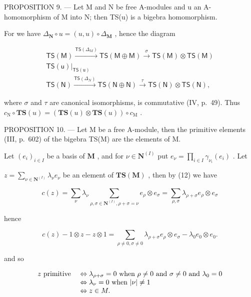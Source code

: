 PROPOSITION 9. --- Let M and N be free A-modules and u an A-homomorphism of M into N; then TS(u) is a bigebra homomorphism.

For we have \(\Delta_{\mathbf{N}} \circ u = (u, u) \circ \Delta_{\mathbf{M}}\) , hence the diagram

\[
\begin{array}{c} \mathsf {T S (M)} \xrightarrow {\mathsf {T S} (\Delta_ {M})} \mathsf {T S (M \oplus M)} \xrightarrow {\sigma} \mathsf {T S (M)} \otimes \mathsf {T S (M)} \\ \mathsf {T S (u)} \Bigg | _ {\mathsf {T S (u)}} \\ \mathsf {T S (N)} \xrightarrow {\mathsf {T S} (\Delta_ {N})} \mathsf {T S (N \oplus N)} \xrightarrow {\tau} \mathsf {T S (N)} \otimes \mathsf {T S (N)}, \end{array}
\]

where \(\sigma\) and \(\tau\) are canonical isomorphisms, is commutative (IV, p.~49). Thus \(c_{\mathrm{N}} \circ \mathbf{T}\mathbf{S}(u) = (\mathbf{T}\mathbf{S}(u) \otimes \mathbf{T}\mathbf{S}(u)) \circ c_{\mathrm{M}}\) .

PROPOSITION 10. --- Let M be a free A-module, then the primitive elements (III, p.~602) of the bigebra TS(M) are the elements of M.

Let \((e_i)_{i\in I}\) be a basis of \(\mathbf{M}\) , and for \(\nu \in \mathbf{N}^{(I)}\) put \(e_{\nu} = \prod_{i\in I}\gamma_{\nu_i}(e_i)\) . Let

\(z = \sum_{\nu \in \mathbf{N}^{(I)}} \lambda_{\nu} e_{\nu}\) be an element of \(\mathbf{T}\mathbf{S}(\mathbf{M})\) , then by (12) we have

\[
c (z) = \sum_ {\nu} \lambda_ {\nu} \sum_ {\rho , \sigma \in \mathbf {N} ^ {(I)}, \rho + \sigma = \nu} e _ {\rho} \otimes e _ {\sigma} = \sum_ {\rho , \sigma} \lambda_ {\rho + \sigma} e _ {\rho} \otimes e _ {\sigma}
\]

hence

\[
c (z) - 1 \otimes z - z \otimes 1 = \sum_ {\rho \neq 0, \sigma \neq 0} \lambda_ {\rho + \sigma} e _ {\rho} \otimes e _ {\sigma} - \lambda_ {0} e _ {0} \otimes e _ {0}.
\]

and so

\[
\begin{array}{r l} z \text {   primitive   } & \Leftrightarrow \lambda_ {\rho + \sigma} = 0 \text {   when   } \rho \neq 0 \text {   and   } \sigma \neq 0 \text {   and   } \lambda_ {0} = 0 \\ & \Leftrightarrow \lambda_ {\nu} = 0 \text {   when   } | \nu | \neq 1 \\ & \Leftrightarrow z \in M. \end{array}
\]

